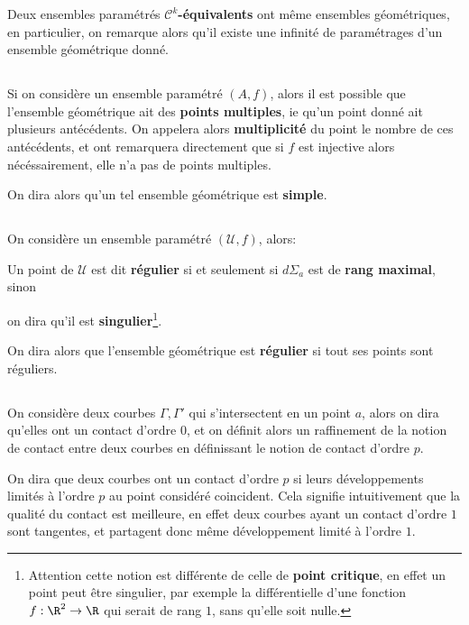 Deux ensembles paramétrés \(\mathcal{C}^k\)\textbf{-équivalents} ont même ensembles géométriques, en particulier, on remarque alors qu'il existe une infinité de paramétrages d'un ensemble géométrique donné.

\subsection*{}
Si on considère un ensemble paramétré \((A, f)\), alors il est possible que l'ensemble géométrique ait des \textbf{points multiples}, ie qu'un point donné ait plusieurs antécédents. On appelera alors \textbf{multiplicité} du point le nombre de ces antécédents, et ont remarquera directement que si \(f\) est injective alors nécéssairement, elle n'a pas de points multiples.\<

On dira alors qu'un tel ensemble géométrique est \textbf{simple}.

\subsection*{}
On considère un ensemble paramétré \((\mathcal{U}, f)\), alors:
\begin{center}
   Un point de \(\mathcal{U}\) est dit \textbf{régulier} si et seulement si \(d\Sigma_a\) est de \textbf{rang maximal}, sinon 
   
   on dira qu'il est \textbf{singulier}\footnote[1]{Attention cette notion est différente de celle de \textbf{point critique}, en effet un point peut être singulier, par exemple la différentielle d'une fonction \(f : \R^2 \rightarrow \R\) qui serait de rang \(1\), sans qu'elle soit nulle.}.
\end{center}
On dira alors que l'ensemble géométrique est \textbf{régulier} si tout ses points sont réguliers.

\subsection*{}
On considère deux courbes \(\Gamma, \Gamma'\) qui s'intersectent en un point \(a\), alors on dira qu'elles ont un contact d'ordre 0, et on définit alors un raffinement de la notion de contact entre deux courbes en définissant le notion de contact d'ordre \(p\).\<

On dira que deux courbes ont un contact d'ordre \(p\) si leurs développements limités à l'ordre \(p\) au point considéré coincident. Cela signifie intuitivement que la qualité du contact est meilleure, en effet deux courbes ayant un contact d'ordre \(1\) sont tangentes, et partagent donc même développement limité à l'ordre \(1\).\<

